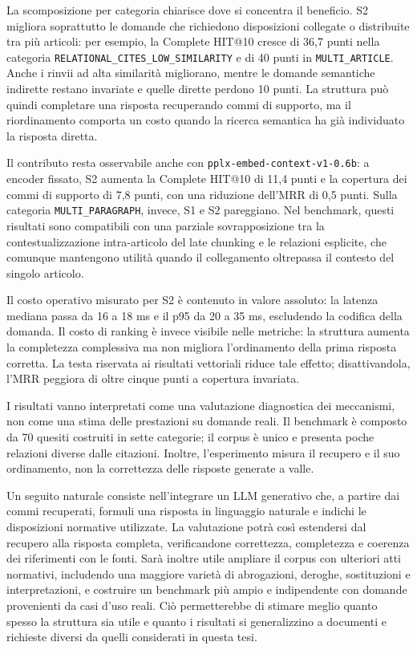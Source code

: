 La scomposizione per categoria chiarisce dove si concentra il beneficio. S2 migliora soprattutto le domande che richiedono disposizioni collegate o distribuite tra più articoli: per esempio, la Complete HIT@10 cresce di 36,7 punti nella categoria \texttt{RELATIONAL\_CITES\_LOW\_SIMILARITY} e di 40 punti in \texttt{MULTI\_ARTICLE}. Anche i rinvii ad alta similarità migliorano, mentre le domande semantiche indirette restano invariate e quelle dirette perdono 10 punti. La struttura può quindi completare una risposta recuperando commi di supporto, ma il riordinamento comporta un costo quando la ricerca semantica ha già individuato la risposta diretta.

Il contributo resta osservabile anche con \texttt{pplx-embed-context-v1-0.6b}: a encoder fissato, S2 aumenta la Complete HIT@10 di 11,4 punti e la copertura dei commi di supporto di 7,8 punti, con una riduzione dell'MRR di 0,5 punti. Sulla categoria \texttt{MULTI\_PARAGRAPH}, invece, S1 e S2 pareggiano. Nel benchmark, questi risultati sono compatibili con una parziale sovrapposizione tra la contestualizzazione intra-articolo del late chunking e le relazioni esplicite, che comunque mantengono utilità quando il collegamento oltrepassa il contesto del singolo articolo.

Il costo operativo misurato per S2 è contenuto in valore assoluto: la latenza mediana passa da 16 a 18 ms e il p95 da 20 a 35 ms, escludendo la codifica della domanda. Il costo di ranking è invece visibile nelle metriche: la struttura aumenta la completezza complessiva ma non migliora l'ordinamento della prima risposta corretta. La testa riservata ai risultati vettoriali riduce tale effetto; disattivandola, l'MRR peggiora di oltre cinque punti a copertura invariata.


I risultati vanno interpretati come una valutazione diagnostica dei meccanismi, non come una stima delle prestazioni su domande reali. Il benchmark è composto da 70 quesiti costruiti in sette categorie; il corpus è unico e presenta poche relazioni diverse dalle citazioni. Inoltre, l'esperimento misura il recupero e il suo ordinamento, non la correttezza delle risposte generate a valle.

Un seguito naturale consiste nell'integrare un LLM generativo che, a partire dai commi recuperati, formuli una risposta in linguaggio naturale e indichi le disposizioni normative utilizzate. La valutazione potrà così estendersi dal recupero alla risposta completa, verificandone correttezza, completezza e coerenza dei riferimenti con le fonti. Sarà inoltre utile ampliare il corpus con ulteriori atti normativi, includendo una maggiore varietà di abrogazioni, deroghe, sostituzioni e interpretazioni, e costruire un benchmark più ampio e indipendente con domande provenienti da casi d'uso reali. Ciò permetterebbe di stimare meglio quanto spesso la struttura sia utile e quanto i risultati si generalizzino a documenti e richieste diversi da quelli considerati in questa tesi.

